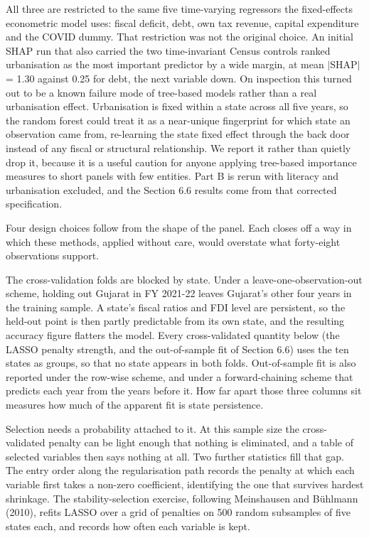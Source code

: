 \documentclass[12pt,a4paper]{article}
\begin{document}
All three are restricted to the same five time-varying regressors the fixed-effects econometric model uses: fiscal deficit, debt, own tax revenue, capital expenditure and the COVID dummy. That restriction was not the original choice. An initial SHAP run that also carried the two time-invariant Census controls ranked urbanisation as the most important predictor by a wide margin, at mean $|$SHAP$|$ = 1.30 against 0.25 for debt, the next variable down. On inspection this turned out to be a known failure mode of tree-based models rather than a real urbanisation effect. Urbanisation is fixed within a state across all five years, so the random forest could treat it as a near-unique fingerprint for which state an observation came from, re-learning the state fixed effect through the back door instead of any fiscal or structural relationship. We report it rather than quietly drop it, because it is a useful caution for anyone applying tree-based importance measures to short panels with few entities. Part B is rerun with literacy and urbanisation excluded, and the Section 6.6 results come from that corrected specification.

Four design choices follow from the shape of the panel. Each closes off a way in which these methods, applied without care, would overstate what forty-eight observations support.

The cross-validation folds are blocked by state. Under a leave-one-observation-out scheme, holding out Gujarat in FY 2021-22 leaves Gujarat's other four years in the training sample. A state's fiscal ratios and FDI level are persistent, so the held-out point is then partly predictable from its own state, and the resulting accuracy figure flatters the model. Every cross-validated quantity below (the LASSO penalty strength, and the out-of-sample fit of Section 6.6) uses the ten states as groups, so that no state appears in both folds. Out-of-sample fit is also reported under the row-wise scheme, and under a forward-chaining scheme that predicts each year from the years before it. How far apart those three columns sit measures how much of the apparent fit is state persistence.

Selection needs a probability attached to it. At this sample size the cross-validated penalty can be light enough that nothing is eliminated, and a table of selected variables then says nothing at all. Two further statistics fill that gap. The entry order along the regularisation path records the penalty at which each variable first takes a non-zero coefficient, identifying the one that survives hardest shrinkage. The stability-selection exercise, following Meinshausen and Bühlmann (2010), refits LASSO over a grid of penalties on 500 random subsamples of five states each, and records how often each variable is kept.
\end{document}
